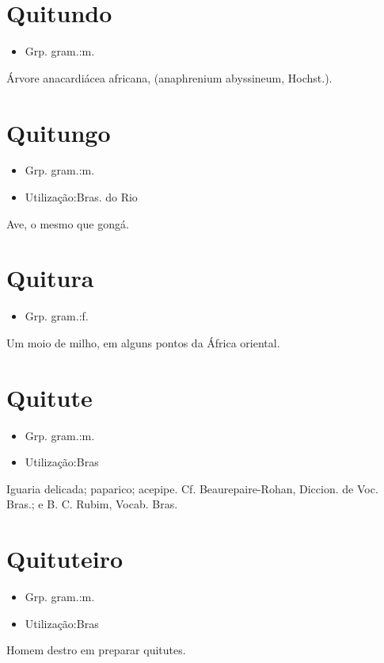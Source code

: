 \section{Quitundo}
\begin{itemize}
\item {Grp. gram.:m.}
\end{itemize}
Árvore anacardiácea africana, (\textunderscore anaphrenium abyssineum\textunderscore , Hochst.).
\section{Quitungo}
\begin{itemize}
\item {Grp. gram.:m.}
\end{itemize}
\begin{itemize}
\item {Utilização:Bras. do Rio}
\end{itemize}
Ave, o mesmo que \textunderscore gongá\textunderscore .
\section{Quitura}
\begin{itemize}
\item {Grp. gram.:f.}
\end{itemize}
Um moio de milho, em alguns pontos da África oriental.
\section{Quitute}
\begin{itemize}
\item {Grp. gram.:m.}
\end{itemize}
\begin{itemize}
\item {Utilização:Bras}
\end{itemize}
Iguaria delicada; paparico; acepipe. Cf. Beaurepaire-Rohan, \textunderscore Diccion. de Voc. Bras.\textunderscore ; e B. C. Rubim, \textunderscore Vocab. Bras.\textunderscore 
\section{Quituteiro}
\begin{itemize}
\item {Grp. gram.:m.}
\end{itemize}
\begin{itemize}
\item {Utilização:Bras}
\end{itemize}
Homem destro em preparar quitutes.
